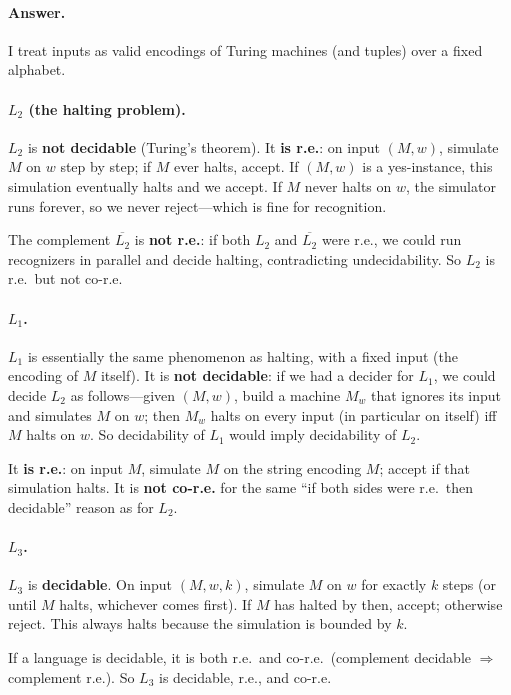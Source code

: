 \documentclass{article}
\theoremstyle{theorem}
\theoremstyle{definition}
\theoremstyle{remark}
\begin{document}
\paragraph{Answer.}
I treat inputs as valid encodings of Turing machines (and tuples) over a fixed alphabet.

\paragraph{$L_2$ (the halting problem).}
$L_2$ is \textbf{not decidable} (Turing's theorem). It \textbf{is r.e.}: on input $(M,w)$, simulate $M$ on $w$ step by step; if $M$ ever halts, accept. If $(M,w)$ is a yes-instance, this simulation eventually halts and we accept. If $M$ never halts on $w$, the simulator runs forever, so we never reject---which is fine for recognition.

The complement $\overline{L_2}$ is \textbf{not r.e.}: if both $L_2$ and $\overline{L_2}$ were r.e., we could run recognizers in parallel and decide halting, contradicting undecidability. So $L_2$ is r.e.\ but not co-r.e.

\paragraph{$L_1$.}
$L_1$ is essentially the same phenomenon as halting, with a fixed input (the encoding of $M$ itself). It is \textbf{not decidable}: if we had a decider for $L_1$, we could decide $L_2$ as follows---given $(M,w)$, build a machine $M_w$ that ignores its input and simulates $M$ on $w$; then $M_w$ halts on every input (in particular on itself) iff $M$ halts on $w$. So decidability of $L_1$ would imply decidability of $L_2$.

It \textbf{is r.e.}: on input $M$, simulate $M$ on the string encoding $M$; accept if that simulation halts. It is \textbf{not co-r.e.} for the same ``if both sides were r.e.\ then decidable'' reason as for $L_2$.

\paragraph{$L_3$.}
$L_3$ is \textbf{decidable}. On input $(M,w,k)$, simulate $M$ on $w$ for exactly $k$ steps (or until $M$ halts, whichever comes first). If $M$ has halted by then, accept; otherwise reject. This always halts because the simulation is bounded by $k$.

If a language is decidable, it is both r.e.\ and co-r.e.\ (complement decidable $\Rightarrow$ complement r.e.). So $L_3$ is decidable, r.e., and co-r.e.
\end{document}
